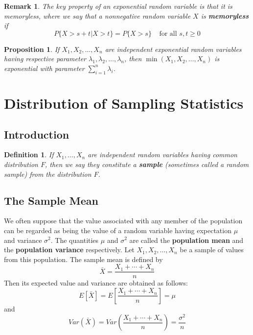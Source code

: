 \documentclass[12pt]{article}
\newtheorem{definition}[theorem]{Definition}
\newtheorem{proposition}[theorem]{Proposition}
\newtheorem{remark}[theorem]{Remark}
\begin{document}
\begin{remark}
  The key property of an exponential random variable is that it is memoryless, where we say that a nonnegative random variable $X$ is \textbf{memoryless} if
  \begin{equation*}
    P\{ X > s+t | X>t \} = P\{ X >s \} \;\;\;\; \text{for all } s,t \ge 0
  \end{equation*}
\end{remark}

\begin{proposition}
  If $X_1,X_2,\dots,X_n$ are independent exponential random variables having respective parameter $\lambda_1, \lambda_2, \dots, \lambda_n$, then $\min(X_1, X_2,\dots,X_n)$ is exponential with parameter $\sum_{i=1}^n \lambda_i$.
\end{proposition}


\section{Distribution of Sampling Statistics}

\subsection{Introduction}

\begin{definition}
  If $X_1,\dots,X_n$ are independent random variables having common distribution $F$, then we say they constitute a \textbf{sample} (sometimes called a \emph{random sample}) from the distribution $F$.
\end{definition}

\subsection{The Sample Mean}

We often suppose that the value associated with any member of the population can be regarded as being the value of a random variable having expectation $\mu$ and variance $\sigma^2$. The quantities $\mu$ and $\sigma^2$ are called the \textbf{population mean} and the \textbf{population variance} respectively. Let $X_1, X_2, \dots, X_n$ be a sample of values from this population. The sample mean is defined by
\begin{equation*}
  \bar{X} = \frac{X_1 + \cdots + X_n}{n}
\end{equation*}
Then its expected value and variance are obtained as follows:
\begin{equation*}
  E[\bar{X}] = E \left[ \frac{X_1 + \cdots + X_n}{n} \right] = \mu
\end{equation*}
and
\begin{equation*}
  Var(\bar{X}) = Var \left( \frac{X_1 + \cdots + X_n}{n} \right)
= \frac{\sigma^2}{n}
\end{equation*}
\end{document}
